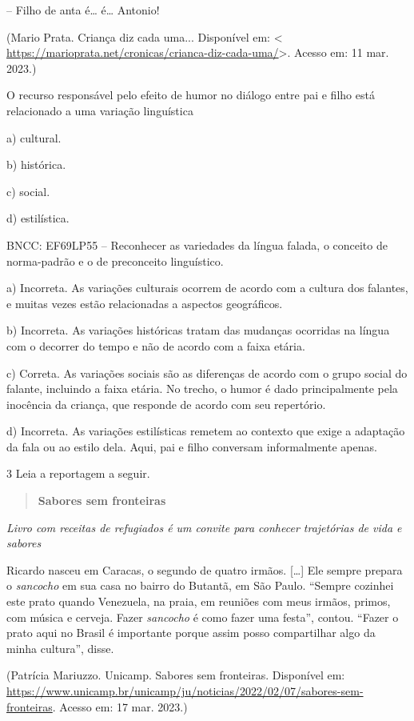 -- Filho de anta é\ldots{} é\ldots{} Antonio!

(Mario Prata. Criança diz cada uma... Disponível em: \textless{}
\url{https://marioprata.net/cronicas/crianca-diz-cada-uma/}\textgreater.
Acesso em: 11 mar. 2023.)

O recurso responsável pelo efeito de humor no diálogo entre pai e filho
está relacionado a uma variação linguística

a) cultural.

b) histórica.

c) social.

d) estilística.

BNCC: EF69LP55 -- Reconhecer as variedades da língua falada, o conceito
de norma-padrão e o de preconceito linguístico.

a) Incorreta. As variações culturais ocorrem de acordo com a cultura dos
falantes, e muitas vezes estão relacionadas a aspectos geográficos.

b) Incorreta. As variações históricas tratam das mudanças ocorridas na
língua com o decorrer do tempo e não de acordo com a faixa etária.

c) Correta. As variações sociais são as diferenças de acordo com o grupo
social do falante, incluindo a faixa etária. No trecho, o humor é dado
principalmente pela inocência da criança, que responde de acordo com seu
repertório.

d) Incorreta. As variações estilísticas remetem ao contexto que exige a
adaptação da fala ou ao estilo dela. Aqui, pai e filho conversam
informalmente apenas.

\num{3} Leia a reportagem a seguir.

\begin{quote}
\textbf{Sabores sem fronteiras}
\end{quote}

\emph{Livro com receitas de refugiados é um convite para conhecer
trajetórias de vida e sabores}

Ricardo nasceu em Caracas, o segundo de quatro irmãos. {[}\ldots{]} Ele
sempre prepara o \emph{sancocho} em sua casa no bairro do Butantã, em
São Paulo. ``Sempre cozinhei este prato quando Venezuela, na praia, em
reuniões com meus irmãos, primos, com música e cerveja. Fazer
\emph{sancocho} é como fazer uma festa'', contou. ``Fazer o prato aqui
no Brasil é importante porque assim posso compartilhar algo da minha
cultura'', disse.

(Patrícia Mariuzzo. Unicamp. Sabores sem fronteiras. Disponível em:
\url{https://www.unicamp.br/unicamp/ju/noticias/2022/02/07/sabores-sem-fronteiras}.
Acesso em: 17 mar. 2023.)

